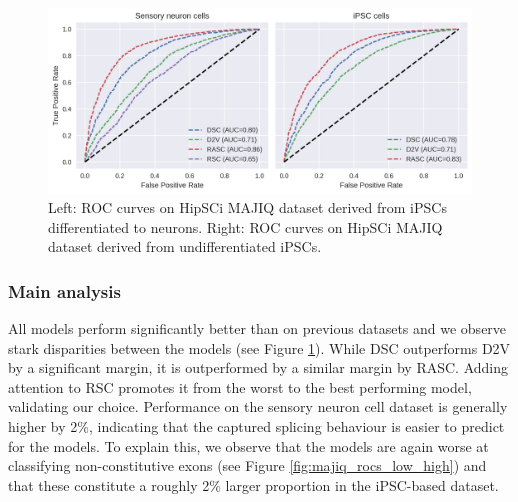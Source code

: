 


\begin{figure}
	\centering\includegraphics[width=1\textwidth]{../visualizations/ch5-results/majiq_neuron_ipsc_cross_model_roc_auc_comparison.png} 
	\caption{Left: ROC curves on HipSCi MAJIQ dataset derived from iPSCs differentiated to neurons. Right: ROC curves on HipSCi MAJIQ dataset derived from undifferentiated iPSCs. }
	\label{fig:majiq_rocs}
\end{figure}

\subsubsection{Main analysis}
All models perform significantly better than on previous datasets and we observe stark disparities between the models (see Figure \ref{fig:majiq_rocs}). While DSC outperforms D2V by a significant margin, it is outperformed by a similar margin by RASC. Adding attention to RSC promotes it from the worst to the best performing model, validating our choice. Performance on the sensory neuron cell dataset is generally higher by 2\%, indicating that the captured splicing behaviour is easier to predict for the models. To explain this, we observe that the models are again worse at classifying non-constitutive exons (see Figure \ref{fig:majiq_rocs_low_high}) and that these constitute a roughly 2\% larger proportion in the iPSC-based dataset. 


